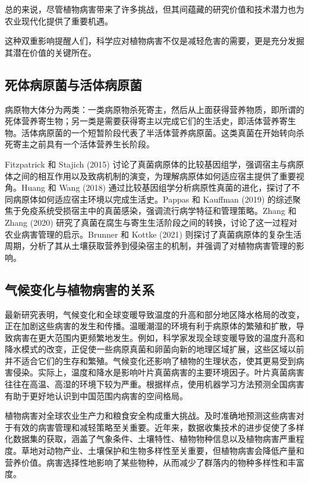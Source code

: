 \documentclass[AutoFakeBold]{LZUThesis-PgD&PhD}
\begin{document}
总的来说，尽管植物病害带来了许多挑战，但其间蕴藏的研究价值和技术潜力也为农业现代化提供了重要机遇。

这种双重影响提醒人们，科学应对植物病害不仅是减轻危害的需要，更是充分发掘其潜在价值的关键所在。


\subsection{死体病原菌与活体病原菌}
病原物大体分为两类：一类病原物杀死寄主，然后从上面获得营养物质，即所谓的死体营养寄生物；另一类是需要获得寄主以完成它们的生活史，即活体营养寄生物。活体病原菌的一个短暂阶段代表了半活体营养病原菌。这类真菌在开始转向杀死寄主之前具有一个活体营养生长阶段。

Fitzpatrick 和 Stajich (2015) 讨论了真菌病原体的比较基因组学，强调宿主与病原体之间的相互作用以及致病机制的演变，为理解病原体如何适应宿主提供了重要视角\cite{fitzpatrick2015comparative}。Huang 和 Wang (2018) 通过比较基因组学分析病原性真菌的进化，探讨了不同病原体如何适应宿主环境以完成生活史\cite{huang2018evolution}。Pappas 和 Kauffman (2019) 的综述聚焦于免疫系统受损宿主中的真菌感染，强调流行病学特征和管理策略\cite{pappas2019fungal}。Zhang 和 Zhang (2020) 研究了真菌在腐生与寄生生活阶段之间的转换，讨论了这一过程对农业病害管理的启示\cite{zhang2020fungi}。Brunner 和 Kottke (2021) 则探讨了真菌病原体的复杂生活周期，分析了其从土壤获取营养到侵染宿主的机制，并强调了对植物病害管理的影响\cite{brunner2021complex}。

\subsection{气候变化与植物病害的关系}

最新研究表明，气候变化和全球变暖导致温度的升高和部分地区降水格局的改变，正在加剧这些病害的发生和传播。温暖潮湿的环境有利于病原体的繁殖和扩散，导致病害在更大范围内更频繁地发生。例如，科学家发现全球变暖导致的温度升高和降水模式的改变，正促使一些病原真菌和卵菌向新的地理区域扩展，这些区域以前并不适合它们的生存和繁殖。气候变化还影响了植物的生理状态，使其更易受到病害侵染。实际上，温度和降水是影响叶片真菌病害的主要环境因子。叶片真菌病害往往在高温、高湿的环境下较为严重。根据样点，使用机器学习方法预测全国病害有助于更好地认识到中国范围内病害的空间格局。

植物病害对全球农业生产力和粮食安全构成重大挑战。及时准确地预测这些病害对于有效的病害管理和减轻策略至关重要。近年来，数据收集技术的进步促使了多样化数据集的获取，涵盖了气象条件、土壤特性、植物物种信息以及植物病害严重程度。草地对动物产业、土壤保护和生物多样性至关重要，但植物病害会降低产量和营养价值\cite{chakraborty2018climate}。病害选择性地影响了某些物种，从而减少了群落内的物种多样性和丰富度\cite{grunberg2023impact}。
\end{document}
